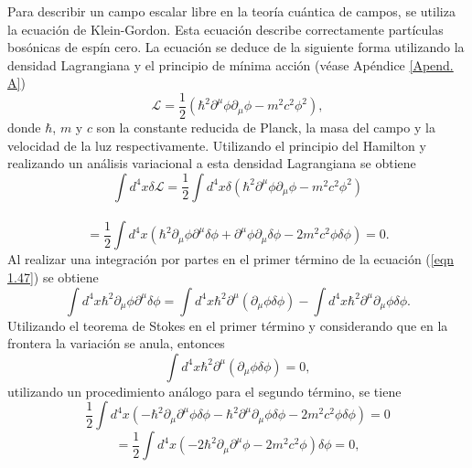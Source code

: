 \documentclass[a4paper,openright,12pt]{book}
\begin{document}
Para describir un campo escalar libre en la teoría cuántica de campos, se utiliza la ecuación de Klein-Gordon. Esta ecuación describe correctamente partículas bosónicas de espín cero. La ecuación se deduce de la siguiente forma utilizando la densidad Lagrangiana y el principio de mínima acción (véase Apéndice \ref{Apend. A})
\begin{equation}
\mathcal{L} = \frac{1}{2}(\hbar^{2}\partial^{\mu}\phi\partial_{\mu}\phi -m^{2}c^{2}\phi^{2}),\label{eqn 1.46}
\end{equation}
donde $\hbar$, $m$ y $c$ son la constante reducida de Planck, la masa del campo y la velocidad de la luz respectivamente. Utilizando el principio del Hamilton y realizando un análisis variacional a esta densidad Lagrangiana se obtiene
\begin{equation*}
\int d^{4}x\delta\mathcal{L}
=
\frac{1}{2} \int d^{4}x\delta(\hbar^{2}\partial^{\mu}\phi\partial_{\mu}\phi -m^{2}c^{2}\phi^{2})
\end{equation*}\
\begin{equation}
= \frac{1}{2}\int d^{4}x(\hbar^{2}\partial_{\mu}\phi\partial^{\mu}\delta\phi 
+ \partial^{\mu}\phi\partial_{\mu}\delta\phi 
-2m^{2}c^{2}\phi\delta\phi)
= 0.
\label{eqn 1.47}
\end{equation}
Al realizar una integración por partes en el primer término de la ecuación (\ref{eqn 1.47}) se obtiene
\begin{equation}
\int d^{4}x\hbar^{2}\partial_{\mu}\phi\partial^{\mu}\delta\phi 
=
\int d^{4}x\hbar^{2}\partial^{\mu}(\partial_{\mu}\phi\delta\phi)
-
\int d^{4}x\hbar^{2}\partial^{\mu}\partial_{\mu}\phi\delta\phi.\label{eqn 1.48}
\end{equation}
Utilizando el teorema de Stokes en el primer término y considerando que en la frontera la variación se anula, entonces
\begin{equation}
\int d^{4}x\hbar^{2}\partial^{\mu}(\partial_{\mu}\phi\delta\phi)=0,\label{eqn 1.49}
\end{equation}
utilizando un procedimiento análogo para el segundo término, se tiene
\begin{equation*}
\frac{1}{2} \int d^{4}x (-\hbar^{2}\partial_{\mu}\partial^{\mu}\phi\delta\phi
- \hbar^{2}\partial^{\mu}\partial_{\mu}\phi\delta\phi
- 2m^{2}c^{2}\phi\delta\phi) = 0
\end{equation*}
\begin{equation}
= \frac{1}{2} \int d^{4}x (-2\hbar^{2}\partial_{\mu}\partial^{\mu}\phi
- 2m^{2}c^{2}\phi)\delta\phi = 0,\label{eqn 1.50}
\end{equation}
\end{document}
